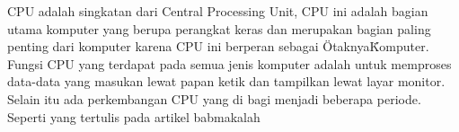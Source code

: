 CPU adalah singkatan dari Central Processing Unit, CPU ini adalah bagian utama komputer yang berupa perangkat keras dan merupakan bagian paling penting dari komputer karena CPU ini berperan sebagai \"Otaknya\" Komputer. Fungsi CPU yang terdapat pada semua jenis komputer adalah untuk memproses data-data yang masukan lewat papan ketik dan tampilkan lewat layar monitor. Selain itu ada perkembangan CPU yang di bagi menjadi beberapa periode. Seperti yang tertulis pada artikel babmakalah \cite{babmakalah}